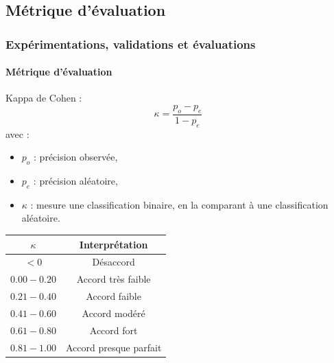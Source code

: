 \documentclass{beamer}
\begin{document}
		\subsection{Métrique d'évaluation}
			\begin{frame}
				\frametitle{Expérimentations, validations et évaluations}
				\framesubtitle{Métrique d'évaluation}
				Kappa de Cohen :
				\begin{equation*}
					\kappa = \frac{p_o - p_e}{1 - p_e}
				\end{equation*}
				avec :
				\begin{itemize}
					\item $p_o$ : précision observée,
					\item $p_e$ : précision aléatoire,
					\item $\kappa$ : mesure une classification binaire, en la comparant à une classification aléatoire.
				\end{itemize}
				\begin{table}
					\centering
					\begin{tabular}{|c|c|}
						\hline
						$\kappa$ & Interprétation \\
						\hline
						$< 0$ & Désaccord \\
						\hline
						$0.00 - 0.20$ & Accord très faible \\
						\hline
						$0.21 - 0.40$ & Accord faible \\
						\hline
						$0.41 - 0.60$ & Accord modéré \\
						\hline
						$0.61 - 0.80$ & Accord fort \\
						\hline
						$0.81 - 1.00$ & Accord presque parfait \\
						\hline
					\end{tabular}
				\end{table}
			\end{frame}
\end{document}
